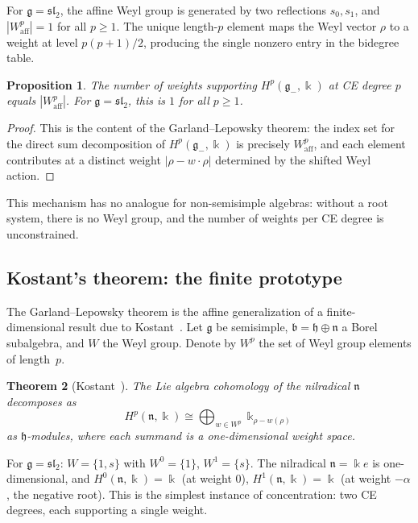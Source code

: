\documentclass[11pt,reqno]{amsart}
\theoremstyle{plain}
\newtheorem{theorem}{Theorem}[section]
\newtheorem{proposition}[theorem]{Proposition}
\theoremstyle{definition}
\theoremstyle{remark}
\newcommand{\fg}{\mathfrak{g}}
\newcommand{\fh}{\mathfrak{h}}
\newcommand{\fn}{\mathfrak{n}}
\newcommand{\fb}{\mathfrak{b}}
\newcommand{\Waff}{W_{\mathrm{aff}}}
\newcommand{\gminus}{\fg_{-}}
\newcommand{\kk}{\Bbbk}
\begin{document}
For $\fg = \mathfrak{sl}_2$, the affine Weyl group is generated by two
reflections $s_0, s_1$, and $|\Waff^p| = 1$ for all $p \ge 1$. The
unique length-$p$ element maps the Weyl vector $\rho$ to a weight at level
$p(p+1)/2$, producing the single nonzero entry in the bidegree table.

\begin{proposition}\label{prop:orbit-count}
 The number of weights supporting $H^p(\gminus, \kk)$ at CE degree $p$
 equals $|\Waff^p|$. For $\fg = \mathfrak{sl}_2$, this is $1$ for all
 $p \ge 1$.
\end{proposition}

\begin{proof}
 This is the content of the Garland--Lepowsky theorem: the index set for the
 direct sum decomposition of $H^p(\gminus, \kk)$ is precisely $\Waff^p$, and
 each element contributes at a distinct weight $|\rho - w\!\cdot\!\rho|$
 determined by the shifted Weyl action.
\end{proof}

This mechanism has no analogue for non-semisimple algebras: without a root
system, there is no Weyl group, and the number of weights per CE degree is
unconstrained.


\subsection{Kostant's theorem: the finite prototype}
\label{sec:kostant}

The Garland--Lepowsky theorem is the affine generalization of a
finite-dimensional result due to Kostant~\cite{Kostant61}. Let $\fg$ be
semisimple, $\fb = \fh \oplus \fn$ a Borel subalgebra, and $W$ the Weyl
group. Denote by $W^p$ the set of Weyl group elements of length~$p$.

\begin{theorem}[Kostant~\cite{Kostant61}]\label{thm:kostant}
 The Lie algebra cohomology of the nilradical $\fn$ decomposes as
 \[
 H^p(\fn, \kk) \cong \bigoplus_{w \in W^p} \kk_{\rho - w(\rho)}
 \]
 as $\fh$-modules, where each summand is a one-dimensional weight space.
\end{theorem}

For $\fg = \mathfrak{sl}_2$: $W = \{1, s\}$ with $W^0 = \{1\}$,
$W^1 = \{s\}$. The nilradical $\fn = \kk e$ is one-dimensional, and
$H^0(\fn, \kk) = \kk$ (at weight $0$), $H^1(\fn, \kk) = \kk$ (at
weight $-\alpha$, the negative root). This is the simplest instance
of concentration: two CE degrees, each supporting a single weight.
\end{document}

